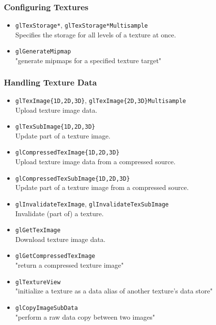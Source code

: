 \documentclass[12pt]{article}
\begin{document}
\subsubsection{Configuring Textures}
\begin{itemize}
\item \texttt{glTexStorage*}, \texttt{glTexStorage*Multisample} \\
	Specifies the storage for all levels of a texture at once.
\item \texttt{glGenerateMipmap} \\
	"generate mipmaps for a specified texture target"
\end{itemize}

\subsubsection{Handling Texture Data}
\begin{itemize}
\item \texttt{glTexImage\{1D,2D,3D\}}, \texttt{glTexImage\{2D,3D\}Multisample} \\
	Upload texture image data.
\item \texttt{glTexSubImage\{1D,2D,3D\}} \\
	Update part of a texture image.
\item \texttt{glCompressedTexImage\{1D,2D,3D\}} \\
	Upload texture image data from a compressed source.
\item \texttt{glCompressedTexSubImage\{1D,2D,3D\}} \\
	Update part of a texture image from a compressed source.
\item \texttt{glInvalidateTexImage}, \texttt{glInvalidateTexSubImage} \\
	Invalidate (part of) a texture.
\item \texttt{glGetTexImage} \\
	Download texture image data.
\item \texttt{glGetCompressedTexImage} \\
	"return a compressed texture image"
\item \texttt{glTextureView} \\
	"initialize a texture as a data alias of another texture's data store"
\item \texttt{glCopyImageSubData} \\
	"perform a raw data copy between two images"
\end{itemize}
\end{document}
